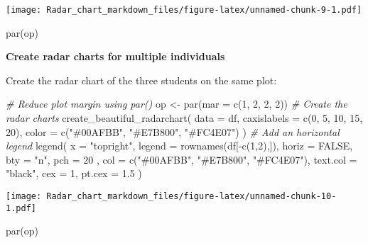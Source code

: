 \documentclass[
]{article}
\newenvironment{Shaded}{\begin{snugshade}}{\end{snugshade}}
\newcommand{\AttributeTok}[1]{\textcolor[rgb]{0.77,0.63,0.00}{#1}}
\newcommand{\CommentTok}[1]{\textcolor[rgb]{0.56,0.35,0.01}{\textit{#1}}}
\newcommand{\ConstantTok}[1]{\textcolor[rgb]{0.00,0.00,0.00}{#1}}
\newcommand{\DecValTok}[1]{\textcolor[rgb]{0.00,0.00,0.81}{#1}}
\newcommand{\FloatTok}[1]{\textcolor[rgb]{0.00,0.00,0.81}{#1}}
\newcommand{\FunctionTok}[1]{\textcolor[rgb]{0.00,0.00,0.00}{#1}}
\newcommand{\NormalTok}[1]{#1}
\newcommand{\OtherTok}[1]{\textcolor[rgb]{0.56,0.35,0.01}{#1}}
\newcommand{\SpecialCharTok}[1]{\textcolor[rgb]{0.00,0.00,0.00}{#1}}
\newcommand{\StringTok}[1]{\textcolor[rgb]{0.31,0.60,0.02}{#1}}
\begin{document}
\texttt{[image: Radar\_chart\_markdown\_files/figure-latex/unnamed-chunk-9-1.pdf]}

\begin{Shaded}
\begin{Highlighting}[]
\FunctionTok{par}\NormalTok{(op)}
\end{Highlighting}
\end{Shaded}

\textbf{Create radar charts for multiple individuals}

Create the radar chart of the three students on the same plot:

\begin{Shaded}
\begin{Highlighting}[]
\CommentTok{\# Reduce plot margin using par()}
\NormalTok{op }\OtherTok{\textless{}{-}} \FunctionTok{par}\NormalTok{(}\AttributeTok{mar =} \FunctionTok{c}\NormalTok{(}\DecValTok{1}\NormalTok{, }\DecValTok{2}\NormalTok{, }\DecValTok{2}\NormalTok{, }\DecValTok{2}\NormalTok{))}
\CommentTok{\# Create the radar charts}
\FunctionTok{create\_beautiful\_radarchart}\NormalTok{(}
  \AttributeTok{data =}\NormalTok{ df, }\AttributeTok{caxislabels =} \FunctionTok{c}\NormalTok{(}\DecValTok{0}\NormalTok{, }\DecValTok{5}\NormalTok{, }\DecValTok{10}\NormalTok{, }\DecValTok{15}\NormalTok{, }\DecValTok{20}\NormalTok{),}
  \AttributeTok{color =} \FunctionTok{c}\NormalTok{(}\StringTok{"\#00AFBB"}\NormalTok{, }\StringTok{"\#E7B800"}\NormalTok{, }\StringTok{"\#FC4E07"}\NormalTok{)}
\NormalTok{)}
\CommentTok{\# Add an horizontal legend}
\FunctionTok{legend}\NormalTok{(}
  \AttributeTok{x =} \StringTok{"topright"}\NormalTok{, }\AttributeTok{legend =} \FunctionTok{rownames}\NormalTok{(df[}\SpecialCharTok{{-}}\FunctionTok{c}\NormalTok{(}\DecValTok{1}\NormalTok{,}\DecValTok{2}\NormalTok{),]), }\AttributeTok{horiz =} \ConstantTok{FALSE}\NormalTok{,}
  \AttributeTok{bty =} \StringTok{"n"}\NormalTok{, }\AttributeTok{pch =} \DecValTok{20}\NormalTok{ , }\AttributeTok{col =} \FunctionTok{c}\NormalTok{(}\StringTok{"\#00AFBB"}\NormalTok{, }\StringTok{"\#E7B800"}\NormalTok{, }\StringTok{"\#FC4E07"}\NormalTok{),}
  \AttributeTok{text.col =} \StringTok{"black"}\NormalTok{, }\AttributeTok{cex =} \DecValTok{1}\NormalTok{, }\AttributeTok{pt.cex =} \FloatTok{1.5}
\NormalTok{)}
\end{Highlighting}
\end{Shaded}

\texttt{[image: Radar\_chart\_markdown\_files/figure-latex/unnamed-chunk-10-1.pdf]}

\begin{Shaded}
\begin{Highlighting}[]
\FunctionTok{par}\NormalTok{(op)}
\end{Highlighting}
\end{Shaded}
\end{document}

